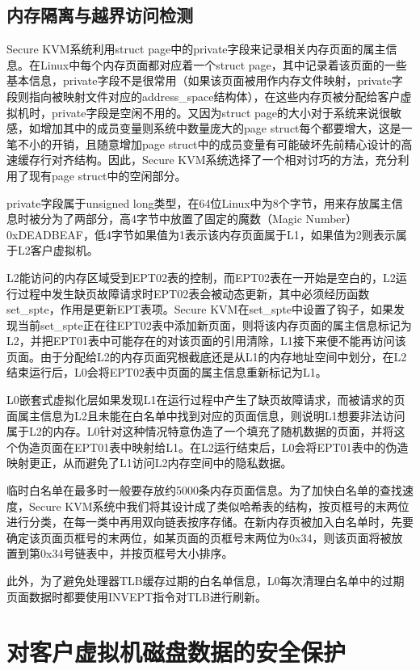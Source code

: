 \subsection{内存隔离与越界访问检测}
Secure KVM系统利用struct page中的private字段来记录相关内存页面的属主信息。在Linux中每个内存页面都对应着一个struct page，其中记录着该页面的一些基本信息，private字段不是很常用（如果该页面被用作内存文件映射，private字段则指向被映射文件对应的address\_space结构体），在这些内存页被分配给客户虚拟机时，private字段是空闲不用的。又因为struct page的大小对于系统来说很敏感，如增加其中的成员变量则系统中数量庞大的page struct每个都要增大，这是一笔不小的开销，且随意增加page struct中的成员变量有可能破坏先前精心设计的高速缓存行对齐结构。因此，Secure KVM系统选择了一个相对讨巧的方法，充分利用了现有page struct中的空闲部分。

private字段属于unsigned long类型，在64位Linux中为8个字节，用来存放属主信息时被分为了两部分，高4字节中放置了固定的魔数（Magic Number）0xDEADBEAF，低4字节如果值为1表示该内存页面属于L1，如果值为2则表示属于L2客户虚拟机。

L2能访问的内存区域受到EPT02表的控制，而EPT02表在一开始是空白的，L2运行过程中发生缺页故障请求时EPT02表会被动态更新，其中必须经历函数set\_spte，作用是更新EPT表项。Secure KVM在set\_spte中设置了钩子，如果发现当前set\_spte正在往EPT02表中添加新页面，则将该内存页面的属主信息标记为L2，并把EPT01表中可能存在的对该页面的引用清除，L1接下来便不能再访问该页面。由于分配给L2的内存页面究根截底还是从L1的内存地址空间中划分，在L2结束运行后，L0会将EPT02表中页面的属主信息重新标记为L1。

L0嵌套式虚拟化层如果发现L1在运行过程中产生了缺页故障请求，而被请求的页面属主信息为L2且未能在白名单中找到对应的页面信息，则说明L1想要非法访问属于L2的内存。L0针对这种情况特意伪造了一个填充了随机数据的页面，并将这个伪造页面在EPT01表中映射给L1。在L2运行结束后，L0会将EPT01表中的伪造映射更正，从而避免了L1访问L2内存空间中的隐私数据。

临时白名单在最多时一般要存放约5000条内存页面信息。为了加快白名单的查找速度，Secure KVM系统中我们将其设计成了类似哈希表的结构，按页框号的末两位进行分类，在每一类中再用双向链表按序存储。在新内存页被加入白名单时，先要确定该页面页框号的末两位，如某页面的页框号末两位为0x34，则该页面将被放置到第0x34号链表中，并按页框号大小排序。

此外，为了避免处理器TLB缓存过期的白名单信息，L0每次清理白名单中的过期页面数据时都要使用INVEPT指令对TLB进行刷新。

\section{对客户虚拟机磁盘数据的安全保护}

